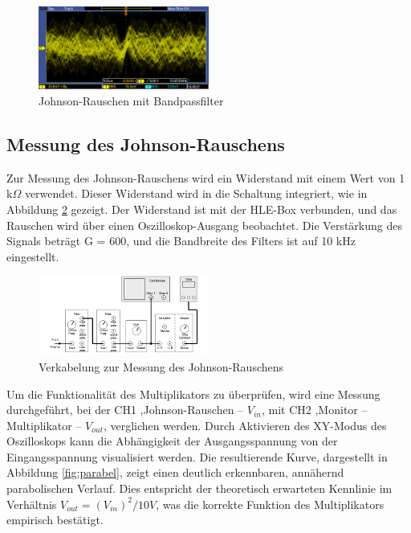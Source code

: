 \documentclass{article}
\begin{document}
\begin{figure}[htbp]
    \centering
    \includegraphics[width=0.5\textwidth]{figs/johnson noise with bandfilter.PNG}
    \caption{Johnson-Rauschen mit Bandpassfilter}
    \label{fig:bandfilter}
\end{figure}
\FloatBarrier

\subsection{Messung des Johnson-Rauschens}
Zur Messung des Johnson-Rauschens wird ein Widerstand mit einem Wert von 1 k$\Omega$ verwendet. Dieser Widerstand wird in die Schaltung integriert, wie in Abbildung \ref{fig:johnson messung} gezeigt. Der Widerstand ist mit der HLE-Box verbunden, und das Rauschen wird über einen Oszilloskop-Ausgang beobachtet. Die Verstärkung des Signals beträgt G = 600, und die Bandbreite des Filters ist auf 10 kHz eingestellt.
\FloatBarrier
\begin{figure}[htbp]
    \centering
    \includegraphics[width=0.5\textwidth]{figs/johnson hle and dmm.png}
    \caption{Verkabelung zur Messung des Johnson-Rauschens \cite{praktikum}}
    \label{fig:johnson messung}
\end{figure}
\FloatBarrier

Um die Funktionalität des Multiplikators zu überprüfen, wird eine Messung durchgeführt, bei der CH1 ,Johnson-Rauschen – $V_{in}$, mit CH2 ,Monitor – Multiplikator – $V_{out}$, verglichen werden. Durch Aktivieren des XY-Modus des Oszilloskops kann die Abhängigkeit der Ausgangsspannung von der Eingangsspannung visualisiert werden. Die resultierende Kurve, dargestellt in Abbildung \ref{fig:parabel}, zeigt einen deutlich erkennbaren, annähernd parabolischen Verlauf. Dies entspricht der theoretisch erwarteten Kennlinie im Verhältnis $V_{out} = (V_{in})^2 / 10 V$, was die korrekte Funktion des Multiplikators empirisch bestätigt. 
\end{document}
